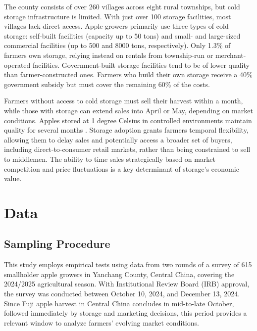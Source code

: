 The county consists of over 260 villages across eight rural townships, but cold storage infrastructure is limited. With just over 100 storage facilities, most villages lack direct access. Apple growers primarily use three types of cold storage: self-built facilities (capacity up to 50 tons) and small- and large-sized commercial facilities (up to 500 and 8000 tons, respectively). Only 1.3\% of farmers own storage, relying instead on rentals from township-run or merchant-operated facilities. Government-built storage facilities tend to be of lower quality than farmer-constructed ones. Farmers who build their own storage receive a 40\% government subsidy but must cover the remaining 60\% of the costs.  

Farmers without access to cold storage must sell their harvest within a month, while those with storage can extend sales into April or May, depending on market conditions. Apples stored at 1 degree Celsius in controlled environments maintain quality for several months \citep{Varela2005Shelf-life, Echeverria2004Relationships}. Storage adoption grants farmers temporal flexibility, allowing them to delay sales and potentially access a broader set of buyers, including direct-to-consumer retail markets, rather than being constrained to sell to middlemen. The ability to time sales strategically based on market competition and price fluctuations is a key determinant of storage's economic value.  



\section{Data}
\subsection{Sampling Procedure}
\noindent This study employs empirical tests using data from two rounds of a survey of 615 smallholder apple growers in Yanchang County, Central China, covering the 2024/2025 agricultural season. With Institutional Review Board (IRB) approval, the survey was conducted between October 10, 2024, and December 13, 2024. Since Fuji apple harvest in Central China concludes in mid-to-late October, followed immediately by storage and marketing decisions, this period provides a relevant window to analyze farmers' evolving market conditions.  

